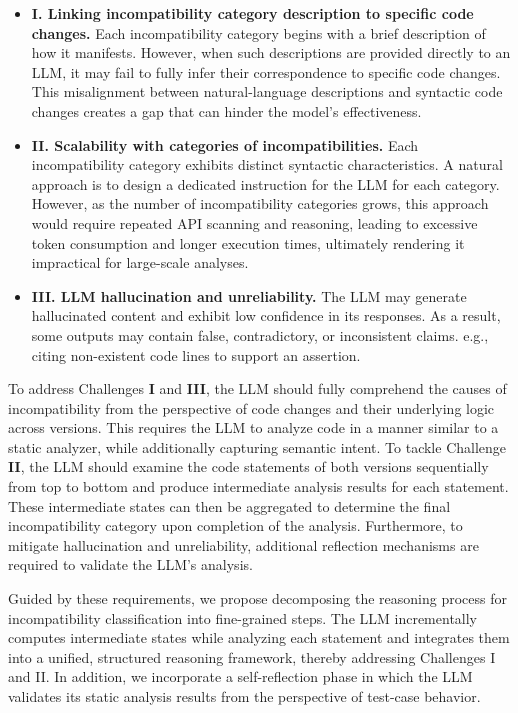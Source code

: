 \begin{itemize}
    \item \textbf{I. Linking incompatibility category description to specific code changes.} Each incompatibility category begins with a brief description of how it manifests. However, when such descriptions are provided directly to an LLM, it may fail to fully infer their correspondence to specific code changes. This misalignment between natural-language descriptions and syntactic code changes creates a gap that can hinder the model's effectiveness.
    \item \textbf{II. Scalability with categories of incompatibilities.} Each incompatibility category exhibits distinct syntactic characteristics. A natural approach is to design a dedicated instruction for the LLM for each category. However, as the number of incompatibility categories grows, this approach would require repeated API scanning and reasoning, leading to excessive token consumption and longer execution times, ultimately rendering it impractical for large-scale analyses.
    \item \textbf{III. LLM hallucination and unreliability.} The LLM may generate hallucinated content and exhibit low confidence in its responses. As a result, some outputs may contain false, contradictory, or inconsistent claims. e.g., citing non-existent code lines to support an assertion.
\end{itemize}



To address Challenges \textbf{I} and \textbf{III}, the LLM should fully comprehend the causes of incompatibility from the perspective of code changes and their underlying logic across versions. This requires the LLM to analyze code in a manner similar to a static analyzer, while additionally capturing semantic intent. To tackle Challenge \textbf{II}, the LLM should examine the code statements of both versions sequentially from top to bottom and produce intermediate analysis results for each statement. These intermediate states can then be aggregated to determine the final incompatibility category upon completion of the analysis. Furthermore, to mitigate hallucination and unreliability, additional reflection mechanisms are required to validate the LLM's analysis.

Guided by these requirements, we propose decomposing the reasoning process for incompatibility classification into fine-grained steps. The LLM incrementally computes intermediate states while analyzing each statement and integrates them into a unified, structured reasoning framework, thereby addressing Challenges I and II. In addition, we incorporate a self-reflection phase in which the LLM validates its static analysis results from the perspective of test-case behavior.

